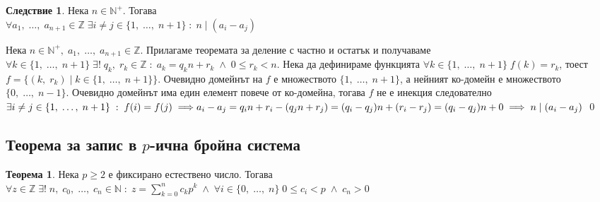 \documentclass[a4paper, 12pt, oneside]{article}
\theoremstyle{definition}
\newtheorem{theorem}{Теорема}
\newtheorem{corollary}{Следствие}
\renewenvironment{proof}{\noindent{\bf Доказателство.}\hspace*{1em}}{\qed\par}
\newcommand{\Z}{\mathbb{Z}}
\newcommand{\N}{\mathbb{N}}
\begin{document}
\begin{corollary}
    Нека $n \in \N^+$. Тогава \\
    $\forall a_1, \; \dots, \; a_{n + 1} \in \Z \; \exists i \neq j \in \{1, \; \dots, \; n + 1\} \; : \; n \; | \; (a_i - a_j)$
\end{corollary}

\begin{proof}
    Нека $n \in \N^+, \; a_1, \; \dots, \; a_{n + 1} \in \Z$. Прилагаме теоремата за деление с частно и остатък и получаваме \\
    $\forall k \in \{1, \; \dots, \; n + 1\} \; \exists! \; q_k, \; r_k \in \Z \; : \; a_k = q_kn + r_k \; \land \; 0 \leq r_k < n$.
    Нека да дефинираме функцията $\forall k \in \{1, \; \dots, \; n + 1\} \; f(k) = r_k$, тоест \\
    $f = \{(k, \; r_k) \; | \; k \in \{1, \; \dots, \; n + 1\}\}$. Очевидно домейнът на $f$ е множеството
    $\{1, \; \dots, \; n + 1\}$, а нейният ко-домейн е множеството $\{0, \; \dots, \; n - 1\}$. Очевидно домейнът
    има един елемент повече от ко-домейна, тогава $f$ не е инекция следователно $\exists i \neq j \in \{1, \; \dots, \; n + 1\} \; : \; f(i) = f(j) \implies \\
    a_i - a_j = q_in + r_i - (q_jn + r_j) = (q_i - q_j)n + (r_i - r_j) = (q_i - q_j)n + 0 \implies n \mid (a_i - a_j)$
\end{proof}

\subsection{Теорема за запис в $p$-ична бройна система}

\begin{theorem}
    Нека $p \geq 2$ е фиксирано естествено число. Тогава \\
    $\forall z \in \Z \; \exists! \; n, \; c_0, \; \dots, \; c_n \in \N \; : \;
    z = \displaystyle\sum_{k = 0}^n c_k p^k \; \land \; \forall i \in \{0, \; \dots, \; n\} \; 0 \leq c_i < p \; \land \; c_n > 0$
\end{theorem}
\end{document}
